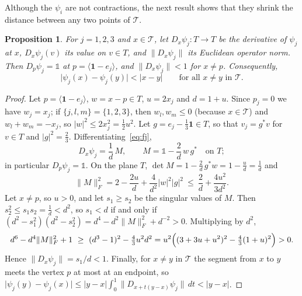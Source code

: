 \documentclass[11pt]{amsart}
\newcommand{\id}{\mathds{1}}
\newtheorem{proposition}{Proposition}[section]
\theoremstyle{definition}
\theoremstyle{remark}
\newcommand{\one}{\mathbf 1}
\newcommand{\cT}{\mathcal T}
\newcommand{\abs}[1]{\lvert #1\rvert}
\newcommand{\norm}[1]{\lVert #1\rVert}
\newcommand{\pr}[1]{\langle #1\rangle}
\begin{document}
\medskip
Although the $\psi_i$ are not contractions, the next result shows that they shrink the distance between any two points of $\cT$.

\begin{proposition}
    \label{lem: Dpsi}
For $j=1,2,3$ and $x\in\cT$, let $D_x\psi_j:T\to T$ be the derivative of $\psi_j$ at $x$, $D_x\psi_j(v)$ its value on $v\in T$, and $\norm{D_x\psi_j}$ its Euclidean operator norm. Then $D_p\psi_j=\id$ at $p=\pr{\one-e_j}$, and $\norm{D_x\psi_j}<1$ for $x\neq p$. Consequently,
\[
  \abs{\psi_j(x)-\psi_j(y)}<\abs{x-y}\qquad\text{for all }x\neq y\text{ in }\cT .
\]
\end{proposition}

\begin{proof}
Let $p=\pr{\one-e_j}$, $w=x-p\in T$, $u=2x_j$ and $d=1+u$. Since $p_j=0$ we have $w_j=x_j$; if $\{j,l,m\}=\{1,2,3\}$, then $w_l,w_m\le0$ (because $x\in\cT$) and $w_l+w_m=-x_j$, so $\abs w^2\le2x_j^2=\frac12u^2$. Let $g=e_j-\frac13\one\in T$, so that $v_j=g^*v$ for $v\in T$ and $\abs g^2=\frac23$. Differentiating~\eqref{eq:fj},
\[
  D_x\psi_j=\frac1d\,M,\qquad M=\id-\frac2d\,w\,g^*\quad\text{on }T;
\]
in particular $D_p\psi_j=\id$. On the plane $T$, $\det M=1-\frac2d\,g^*w=1-\frac ud=\frac1d$ and
\[
  \norm M_F^2=2-\frac{2u}d+\frac4{d^2}\abs w^2\abs g^2\ \le\ \frac2d+\frac{4u^2}{3d^2}.
\]
Let $x\neq p$, so $u>0$, and let $s_1\ge s_2$ be the singular values of $M$. Then $s_2^2\le s_1s_2=\frac1d<d^2$, so $s_1<d$ if and only if $(d^2-s_1^2)(d^2-s_2^2)=d^4-d^2\norm M_F^2+d^{-2}>0$. Multiplying by $d^2$,
\[
  d^6-d^4\norm M_F^2+1\ \ge\ (d^3-1)^2-\tfrac43u^2d^2=u^2\Bigl((3+3u+u^2)^2-\tfrac43(1+u)^2\Bigr)>0 .
\]
Hence $\norm{D_x\psi_j}=s_1/d<1$. Finally, for $x\neq y$ in $\cT$ the segment from $x$ to $y$ meets the vertex $p$ at most at an endpoint, so $\abs{\psi_j(y)-\psi_j(x)}\le\abs{y-x}\int_0^1\norm{D_{x+t(y-x)}\psi_j}\,dt<\abs{y-x}$.
\end{proof}
\end{document}
